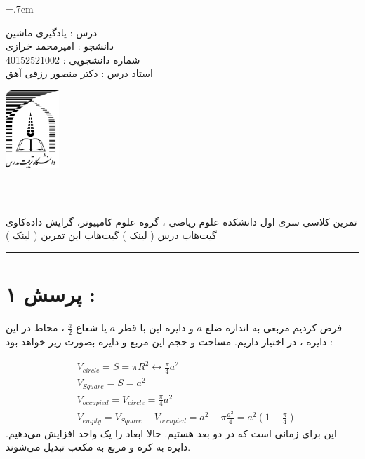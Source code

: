\documentclass[a4paper, 12pt]{article}
\begin{document}
	
\noindent
\begin{minipage}[c]{5cm}
	\baselineskip=.7cm
	\begin{flushright}
		درس : یادگیری ماشین 
		\\
		دانشجو :
		امیرمحمد خرازی
		\\
		شماره دانشجویی :
		40152521002 
		\\
		استاد درس :  
		\href{mrezghi.ir}{دکتر منصور رزقی آهق}
	\end{flushright}
\end{minipage}
\hfill
\begin{minipage}[c]{3cm}
	\begin{center}
		\href{modares.ac.ir}{
			\includegraphics[width=2cm]{logo.png}}
	\end{center}	
\end{minipage}
\\[1mm]
\hrule depth .5mm \relax
\begin{flushright}
	تمرین کلاسی سری اول
	\hfill
	دانشکده علوم ریاضی ، گروه علوم کامپیوتر، گرایش داده‌کاوی
	\\
	\vspace{5mm}
	گیت‌هاب درس (
	\href{https://github.com/A-M-Kharazi/Machine-Learning-TMU.git}{لینک}
	)
	\hfill
	گیت‌هاب این تمرین (
	\href{https://github.com/A-M-Kharazi/Machine-Learning-TMU/tree/main/Questions/HW-Series1}{لینک}
	)
\end{flushright}

\hrule depth .5mm\relax



\section*{پرسش ۱ : }


فرض کردیم مربعی به اندازه ضلع 
$a$
و دایره این با قطر
$a$
یا شعاع
$\frac{a}{2}$
، محاط در این دایره ، در اختیار داریم. مساحت و حجم این مربع و دایره بصورت زیر خواهد بود :

\begin{align*}
	&V_{circle}= S = \pi R^2 \longleftrightarrow \frac{\pi}{4} a^2\\
	&V_{Square} = S = a^2 \\
	&V_{occupied} = V_{circle} = \frac{\pi}{4} a^2 \\
	&V_{empty} = V_{Square} - V_{occupied} = a^2 - \pi \frac{a^2}{4} = a^2 (1 - \frac{\pi}{4})
\end{align*} 
این برای زمانی است که در دو بعد هستیم. حالا ابعاد را یک واحد افزایش می‌دهیم. دایره به کره و مربع به مکعب تبدیل می‌شوند.
\end{document}
